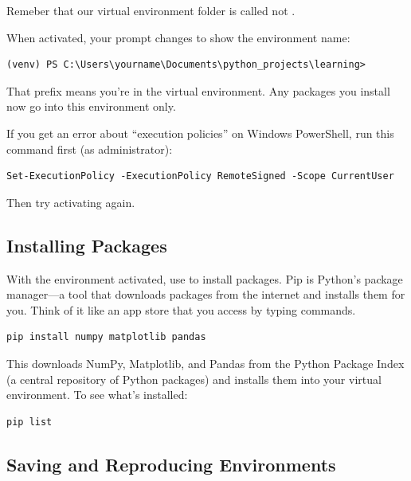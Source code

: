 \begin{note}
Remeber that our virtual environment folder is called  not .
\end{note}

When activated, your prompt changes to show the environment name:

\begin{lstlisting}[style=shellstyle]
(venv) PS C:\Users\yourname\Documents\python_projects\learning>
\end{lstlisting}

That  prefix means you're in the virtual environment. Any packages you install now go into this environment only.

\begin{warning}
If you get an error about ``execution policies'' on Windows PowerShell, run this command first (as administrator):
\begin{lstlisting}[style=shellstyle]
Set-ExecutionPolicy -ExecutionPolicy RemoteSigned -Scope CurrentUser
\end{lstlisting}
Then try activating again.
\end{warning}

\subsection{Installing Packages}

With the environment activated, use  to install packages. Pip is Python's package manager---a tool that downloads packages from the internet and installs them for you. Think of it like an app store that you access by typing commands.

\begin{lstlisting}[style=shellstyle]
pip install numpy matplotlib pandas
\end{lstlisting}

This downloads NumPy, Matplotlib, and Pandas from the Python Package Index (a central repository of Python packages) and installs them into your virtual environment. To see what's installed:

\begin{lstlisting}[style=shellstyle]
pip list
\end{lstlisting}

\subsection{Saving and Reproducing Environments}

